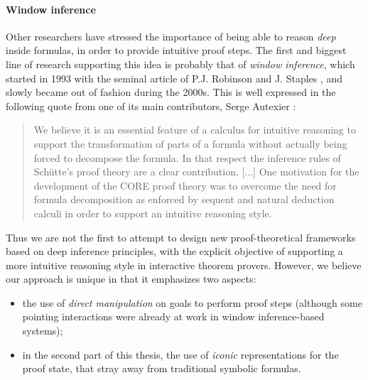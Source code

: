 \paragraph{Window inference}

Other researchers have stressed the importance of being able to reason
\emph{deep} inside formulas, in order to provide intuitive proof steps. The
first and biggest line of research supporting this idea is probably that of
\emph{window inference}, which started in 1993 with the seminal article of P.J.
Robinson and J. Staples , and slowly became
out of fashion during the 2000s. This is well expressed in the following quote
from one of its main contributors, Serge Autexier
:

\begin{quote}
We believe it is an essential feature of a calculus for intuitive reasoning to
support the transformation of parts of a formula without actually being forced
to decompose the formula. In that respect the inference rules of Schütte's proof
theory are a clear contribution. [...] One motivation for the development of the
CORE proof theory was to overcome the need for formula decomposition as enforced
by sequent and natural deduction calculi in order to support an intuitive
reasoning style.
\end{quote}

Thus we are not the first to attempt to design new proof-theoretical frameworks
based on deep inference principles, with the explicit objective of supporting a
more intuitive reasoning style in interactive theorem provers. However, we believe our approach
is unique in that it emphasizes two aspects:
\begin{itemize}
  \item the use of \emph{direct manipulation} on goals to perform proof steps
  (although some pointing interactions were already at work in window
  inference-based systems);
  \item in the second part of this thesis, the use of \emph{iconic}
  representations for the proof state, that stray away from traditional symbolic
  formulas.
\end{itemize}


